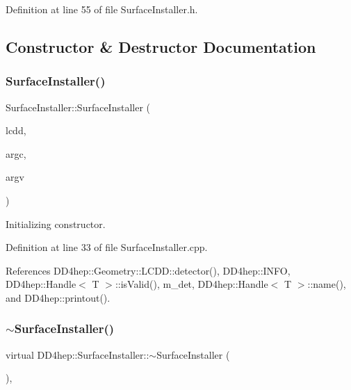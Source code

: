 Definition at line 55 of file Surface\+Installer.\+h.



\subsection{Constructor \& Destructor Documentation}
\hypertarget{class_d_d4hep_1_1_surface_installer_a3d66822b1627a31f133d29f0c330b82c}{}\label{class_d_d4hep_1_1_surface_installer_a3d66822b1627a31f133d29f0c330b82c} 
\subsubsection{\texorpdfstring{Surface\+Installer()}{SurfaceInstaller()}}
{\footnotesize\ttfamily Surface\+Installer\+::\+Surface\+Installer (\begin{DoxyParamCaption}\item[{\hyperlink{class_d_d4hep_1_1_surface_installer_a155d137884c31b56d13fb58846e562a3}{L\+C\+DD} \&}]{lcdd,  }\item[{int}]{argc,  }\item[{char $\ast$$\ast$}]{argv }\end{DoxyParamCaption})}



Initializing constructor. 



Definition at line 33 of file Surface\+Installer.\+cpp.



References D\+D4hep\+::\+Geometry\+::\+L\+C\+D\+D\+::detector(), D\+D4hep\+::\+I\+N\+FO, D\+D4hep\+::\+Handle$<$ T $>$\+::is\+Valid(), m\+\_\+det, D\+D4hep\+::\+Handle$<$ T $>$\+::name(), and D\+D4hep\+::printout().

\hypertarget{class_d_d4hep_1_1_surface_installer_a4fa5c2ba032d20b735556b8e90aacfdb}{}\label{class_d_d4hep_1_1_surface_installer_a4fa5c2ba032d20b735556b8e90aacfdb} 
\subsubsection{\texorpdfstring{$\sim$\+Surface\+Installer()}{~SurfaceInstaller()}}
{\footnotesize\ttfamily virtual D\+D4hep\+::\+Surface\+Installer\+::$\sim$\+Surface\+Installer (\begin{DoxyParamCaption}{ }\end{DoxyParamCaption})\hspace{0.3cm}{\ttfamily [inline]}, {\ttfamily [virtual]}}



